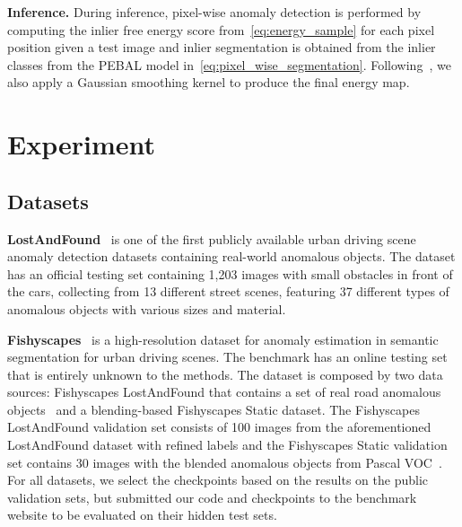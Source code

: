 \documentclass[runningheads]{llncs}
\begin{document}
\vspace{3pt}
\noindent \textbf{Inference.} During inference, pixel-wise anomaly detection is performed by computing the inlier free energy score  from~\eqref{eq:energy_sample} for each pixel position  given a test image  and inlier segmentation is obtained from the inlier classes from the PEBAL model in~\eqref{eq:pixel_wise_segmentation}. Following~\cite{jung2021standardized}, we also apply a Gaussian smoothing kernel to produce the final energy map. 










\vspace{-10pt}
\section{Experiment}
\label{sec:experiment}

\vspace{-5pt}
\subsection{Datasets}
\noindent \textbf{LostAndFound}~\cite{pinggera2016lost} is one of the first publicly available urban driving scene anomaly detection datasets  containing real-world anomalous objects. The dataset has an official testing set containing 1,203 images with small obstacles in front of the cars, collecting from 13 different street scenes, featuring 37 different types of anomalous objects with various sizes and material. 





\noindent \textbf{Fishyscapes}~\cite{blum2019fishyscapes} is a high-resolution dataset for anomaly estimation in semantic segmentation for urban driving scenes. The benchmark has an online testing set that is entirely unknown to the methods. The dataset is composed by two data sources: Fishyscapes LostAndFound that contains a set of real road anomalous objects~\cite{pinggera2016lost} 
and a blending-based Fishyscapes Static dataset. 
The Fishyscapes LostAndFound validation set consists of 100 images from the aforementioned
LostAndFound dataset with refined labels and the Fishyscapes Static validation set contains 30 images with the blended anomalous objects from Pascal VOC~\cite{everingham2010pascal}. 
For all datasets, we select the checkpoints based on the results on the public validation sets, but submitted our code and checkpoints to the benchmark website to be evaluated on their hidden test sets. 
\end{document}

